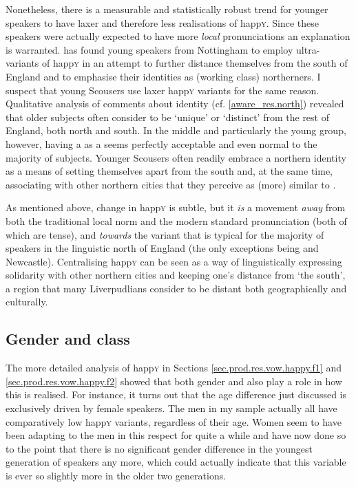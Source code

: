 Nonetheless, there is a measurable and statistically robust trend for younger speakers to have laxer and therefore less  realisations of happ\textsc{y}.
Since these speakers were actually expected to have more \emph{local} pronunciations an explanation is warranted.
\textcite{flynn2010} has found young speakers from Nottingham to employ ultra- variants of happ\textsc{y} in an attempt to further distance themselves from the south of England and to emphasise their identities as (working class) northerners.
I suspect that young Scousers use laxer happ\textsc{y} variants for the same reason.
Qualitative analysis of comments about identity (cf. \ref{aware_res.north}) revealed that older subjects often consider  to be `unique' or `distinct' from the rest of England, both north and south.
In the middle and particularly the young group, however, having a  as a  seems perfectly acceptable and even normal to the majority of subjects.
Younger Scousers often readily embrace a northern identity as a means of setting themselves apart from the south and, at the same time, associating with other northern cities that they perceive as (more) similar to .

As mentioned above, change in happ\textsc{y} is subtle, but it \emph{is} a movement \emph{away} from both the traditional local norm and the modern standard pronunciation (both of which are tense), and \emph{towards} the variant that is typical for the majority of speakers in the linguistic north of England (the only exceptions being  and Newcastle).
Centralising happ\textsc{y} can be seen as a way of linguistically expressing solidarity with other northern cities and keeping one's distance from `the south', a region that many Liverpudlians consider to be distant both geographically and culturally.

\subsection{Gender and class}
\label{prod.disc.happy.social}

The more detailed analysis of happ\textsc{y} in Sections \ref{sec.prod.res.vow.happy.f1} and \ref{sec.prod.res.vow.happy.f2} showed that both gender and  also play a role in how this  is realised.
For instance, it turns out that the age difference just discussed is exclusively driven by female speakers.
The men in my sample actually all have comparatively low happ\textsc{y} variants, regardless of their age.
Women seem to have been adapting to the men in this respect for quite a while and have now done so to the point that there is no significant gender difference in the youngest generation of speakers any more, which could actually indicate that this variable is ever so slightly more  in the older two generations.

